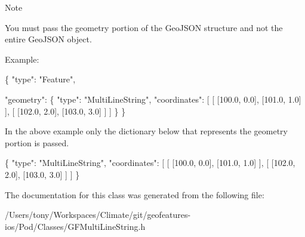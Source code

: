 \begin{DoxyNote}{Note}


You must pass the geometry portion of the Geo\+J\+S\+O\+N structure and not the entire Geo\+J\+S\+O\+N object.

Example\+:


\begin{DoxyCode}
\{
      \textcolor{stringliteral}{"type"}: \textcolor{stringliteral}{"Feature"},

      \textcolor{stringliteral}{"geometry"}: \{ \textcolor{stringliteral}{"type"}: \textcolor{stringliteral}{"MultiLineString"},
                    \textcolor{stringliteral}{"coordinates"}: [
                              [ [100.0, 0.0], [101.0, 1.0] ],
                              [ [102.0, 2.0], [103.0, 3.0] ]
                      ]
                  \}
 \}
\end{DoxyCode}


In the above example only the dictionary below that represents the geometry portion is passed.


\begin{DoxyCode}
\{
    \textcolor{stringliteral}{"type"}: \textcolor{stringliteral}{"MultiLineString"},
    \textcolor{stringliteral}{"coordinates"}: [
            [ [100.0, 0.0], [101.0, 1.0] ],
            [ [102.0, 2.0], [103.0, 3.0] ]
      ]
\}
\end{DoxyCode}
 
\end{DoxyNote}


The documentation for this class was generated from the following file\+:\begin{DoxyCompactItemize}
\item 
/\+Users/tony/\+Workspaces/\+Climate/git/geofeatures-\/ios/\+Pod/\+Classes/G\+F\+Multi\+Line\+String.\+h\end{DoxyCompactItemize}
